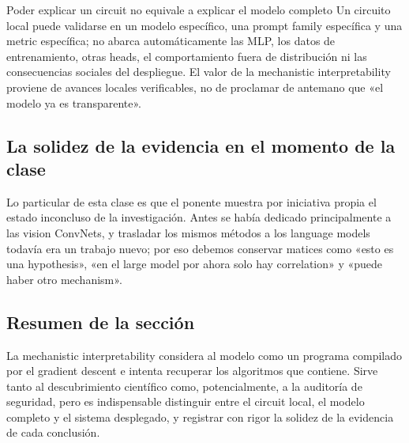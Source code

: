 
\begin{warningbox}{Poder explicar un circuit no equivale a explicar el modelo completo}
Un circuito local puede validarse en un modelo específico, una prompt family específica y una metric específica; no abarca automáticamente las MLP, los datos de entrenamiento, otras heads, el comportamiento fuera de distribución ni las consecuencias sociales del despliegue. El valor de la mechanistic interpretability proviene de avances locales verificables, no de proclamar de antemano que «el modelo ya es transparente».
\end{warningbox}

\subsection{La solidez de la evidencia en el momento de la clase}

Lo particular de esta clase es que el ponente muestra por iniciativa propia el estado inconcluso de la investigación. Antes se había dedicado principalmente a las vision ConvNets, y trasladar los mismos métodos a los language models todavía era un trabajo nuevo; por eso debemos conservar matices como «esto es una hypothesis», «en el large model por ahora solo hay correlation» y «puede haber otro mechanism».



\subsection{Resumen de la sección}

La mechanistic interpretability considera al modelo como un programa compilado por el gradient descent e intenta recuperar los algoritmos que contiene. Sirve tanto al descubrimiento científico como, potencialmente, a la auditoría de seguridad, pero es indispensable distinguir entre el circuit local, el modelo completo y el sistema desplegado, y registrar con rigor la solidez de la evidencia de cada conclusión.

